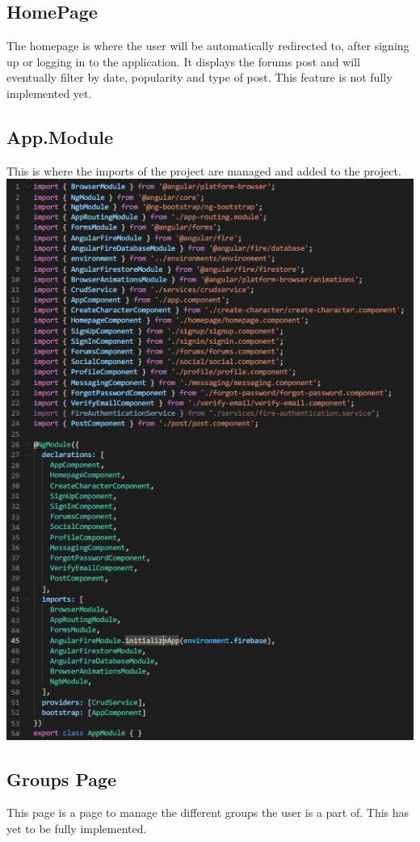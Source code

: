 \subsection{HomePage}
The homepage is where the user will be automatically redirected to, after signing up or logging in to the application. It displays the forums post and will eventually filter by date, popularity and type of post. This feature is not fully implemented yet.
\subsection{App.Module}
This is where the imports of the project are managed and added to the project.\\
\includegraphics[scale=0.3]{./img/Imports.png} \\
\subsection{Groups Page}
This page is a page to manage the different groups the user is a part of. This has yet to be fully implemented.
